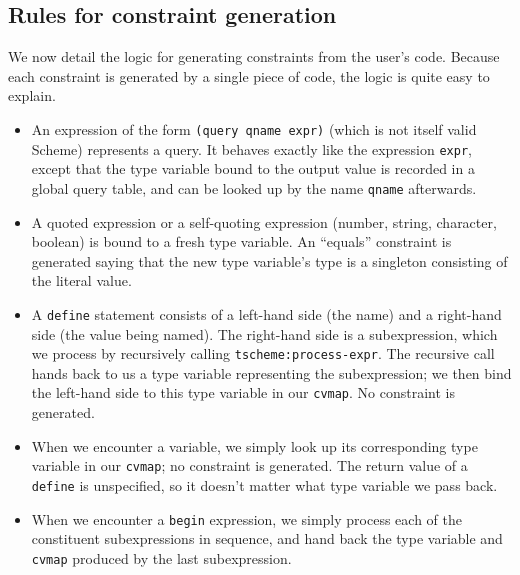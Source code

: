 \documentclass[a4paper]{article}
\newcommand{\T}[1]{\texttt{#1}}
\begin{document}
\subsection{Rules for constraint generation} \label{sec:constraint-generation-rules}
We now detail the logic for generating constraints from the user's code.
Because each constraint is generated by a single piece of code, the logic is
quite easy to explain.

\newcommand{\lra}{\longrightarrow}
\begin{itemize}
  \item An expression of the form \T{(query qname expr)} (which is not itself
    valid Scheme) represents a query.  It behaves exactly like the expression
    \T{expr}, except that the type variable bound to the output value is
    recorded in a global query table, and can be looked up by the name \T{qname}
    afterwards.

  \item A quoted expression or a self-quoting expression (number, string,
    character, boolean) is bound to a fresh type variable.  An ``equals''
    constraint is generated saying that the new type variable's type is a
    singleton consisting of the literal value.

  \item A \T{define} statement consists of a left-hand side (the name) and a
    right-hand side (the value being named).  The right-hand side is a
    subexpression, which we process by recursively calling
    \T{tscheme:process-expr}.  The recursive call hands back to us a type
    variable representing the subexpression; we then bind the left-hand side to
    this type variable in our \T{cvmap}.  No constraint is generated.

  \item When we encounter a variable, we simply look up its corresponding type
    variable in our \T{cvmap}; no constraint is generated.  The return value of
    a \T{define} is unspecified, so it doesn't matter what type variable we pass
    back.

  \item When we encounter a \T{begin} expression, we simply process each of the
    constituent subexpressions in sequence, and hand back the type variable and
    \T{cvmap} produced by the last subexpression.


\end{itemize}
\end{document}
